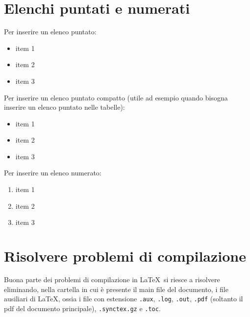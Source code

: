 \section{Elenchi puntati e numerati}

Per inserire un elenco puntato:

\begin{itemize}
\item item 1
\item item 2
\item item 3
\end{itemize}

Per inserire un elenco puntato compatto (utile ad esempio quando bisogna inserire un elenco puntato nelle tabelle):

\begin{itemize}[noitemsep,topsep=0pt,parsep=0pt,partopsep=0pt]
\item item 1
\item item 2
\item item 3
\end{itemize}

Per inserire un elenco numerato:

\begin{enumerate}
\item item 1
\item item 2
\item item 3
\end{enumerate}

\section{Risolvere problemi di compilazione}

Buona parte dei problemi di compilazione in \LaTeX\ si riesce a risolvere eliminando, nella cartella in cui è presente il main file del documento, i file ausiliari di \LaTeX , ossia i file con estensione \verb!.aux!, \verb!.log!, \verb!.out!, \verb!.pdf! (soltanto il pdf del documento principale), \verb!.synctex.gz! e \verb!.toc!.

\clearpage